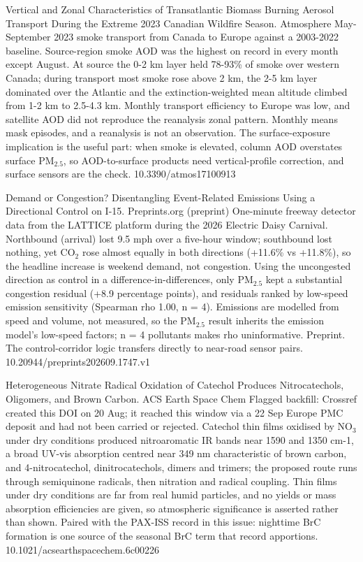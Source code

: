 \documentclass[10pt]{article}
\begin{document}
{Vertical and Zonal Characteristics of Transatlantic Biomass Burning Aerosol Transport During the Extreme 2023 Canadian Wildfire Season.}
{Atmosphere}
{May-September 2023 smoke transport from Canada to Europe against a 2003-2022 baseline. Source-region smoke AOD was the highest on record in every month except August. At source the 0-2 km layer held 78-93\% of smoke over western Canada; during transport most smoke rose above 2 km, the 2-5 km layer dominated over the Atlantic and the extinction-weighted mean altitude climbed from 1-2 km to 2.5-4.3 km. Monthly transport efficiency to Europe was low, and satellite AOD did not reproduce the reanalysis zonal pattern. Monthly means mask episodes, and a reanalysis is not an observation. The surface-exposure implication is the useful part: when smoke is elevated, column AOD overstates surface PM$_{2.5}$, so AOD-to-surface products need vertical-profile correction, and surface sensors are the check.}
{10.3390/atmos17100913}

{Demand or Congestion? Disentangling Event-Related Emissions Using a Directional Control on I-15.}
{Preprints.org (preprint)}
{One-minute freeway detector data from the LATTICE platform during the 2026 Electric Daisy Carnival. Northbound (arrival) lost 9.5 mph over a five-hour window; southbound lost nothing, yet CO$_2$ rose almost equally in both directions (+11.6\% vs +11.8\%), so the headline increase is weekend demand, not congestion. Using the uncongested direction as control in a difference-in-differences, only PM$_{2.5}$ kept a substantial congestion residual (+8.9 percentage points), and residuals ranked by low-speed emission sensitivity (Spearman rho 1.00, n = 4). Emissions are modelled from speed and volume, not measured, so the PM$_{2.5}$ result inherits the emission model's low-speed factors; n = 4 pollutants makes rho uninformative. Preprint. The control-corridor logic transfers directly to near-road sensor pairs.}
{10.20944/preprints202609.1747.v1}

{Heterogeneous Nitrate Radical Oxidation of Catechol Produces Nitrocatechols, Oligomers, and Brown Carbon.}
{ACS Earth Space Chem}
{Flagged backfill: Crossref created this DOI on 20 Aug; it reached this window via a 22 Sep Europe PMC deposit and had not been carried or rejected. Catechol thin films oxidised by NO$_3$ under dry conditions produced nitroaromatic IR bands near 1590 and 1350 cm-1, a broad UV-vis absorption centred near 349 nm characteristic of brown carbon, and 4-nitrocatechol, dinitrocatechols, dimers and trimers; the proposed route runs through semiquinone radicals, then nitration and radical coupling. Thin films under dry conditions are far from real humid particles, and no yields or mass absorption efficiencies are given, so atmospheric significance is asserted rather than shown. Paired with the PAX-ISS record in this issue: nighttime BrC formation is one source of the seasonal BrC term that record apportions.}
{10.1021/acsearthspacechem.6c00226}
\end{document}
